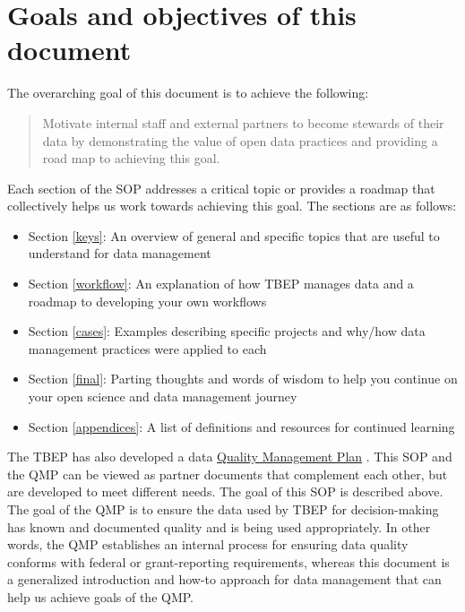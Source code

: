 \documentclass[
]{book}
\providecommand{\tightlist}{%
  \setlength{\itemsep}{0pt}\setlength{\parskip}{0pt}}
\begin{document}
\hypertarget{goals-and-objectives-of-this-document}{%
\section{Goals and objectives of this document}\label{goals-and-objectives-of-this-document}}

The overarching goal of this document is to achieve the following:

\begin{quote}
Motivate internal staff and external partners to become stewards of their data by demonstrating the value of open data practices and providing a road map to achieving this goal.
\end{quote}

Each section of the SOP addresses a critical topic or provides a roadmap that collectively helps us work towards achieving this goal. The sections are as follows:

\begin{itemize}
\tightlist
\item
  Section \ref{keys}: An overview of general and specific topics that are useful to understand for data management
\item
  Section \ref{workflow}: An explanation of how TBEP manages data and a roadmap to developing your own workflows
\item
  Section \ref{cases}: Examples describing specific projects and why/how data management practices were applied to each
\item
  Section \ref{final}: Parting thoughts and words of wisdom to help you continue on your open science and data management journey
\item
  Section \ref{appendices}: A list of definitions and resources for continued learning
\end{itemize}

The TBEP has also developed a data \href{https://drive.google.com/file/d/1DyA0PNHV8rEXGMwGiyS7sXY1ECLYpJJO/view}{Quality Management Plan} \citep[QMP;][]{tbep1620}. This SOP and the QMP can be viewed as partner documents that complement each other, but are developed to meet different needs. The goal of this SOP is described above. The goal of the QMP is to ensure the data used by TBEP for decision-making has known and documented quality and is being used appropriately. In other words, the QMP establishes an internal process for ensuring data quality conforms with federal or grant-reporting requirements, whereas this document is a generalized introduction and how-to approach for data management that can help us achieve goals of the QMP.
\end{document}
